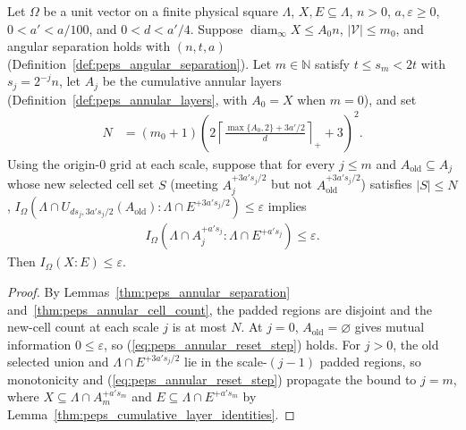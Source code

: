 \begin{lemma}
    \label{thm:peps_annular_information_induction}
    \leanok
    Let $\Omega$ be a unit vector on a finite physical square $\Lambda$,
    $X,E\subseteq\Lambda$, $n>0$, $a,\varepsilon\ge0$,
    $0<a'<a/100$, and $0<d<a'/4$. Suppose $\operatorname{diam}_\infty X\le A_0n$, $|\mathcal V|\le m_0$, and angular separation holds with $(n,t,a)$ (Definition~\ref{def:peps_angular_separation}).
    Let $m\in\mathbb N$ satisfy $t\le s_m<2t$ with $s_j=2^{-j}n$,
    let $A_j$ be the cumulative annular layers (Definition~\ref{def:peps_annular_layers}, with $A_0=X$ when $m=0$), and set
    \begin{align}
        N & =(m_0+1)\left(2\left\lceil
        \frac{\max\{A_0,2\}+3a'/2}{d}\right\rceil_++3\right)^2.
        \label{eq:peps_annular_induction_cell_budget}
    \end{align}
    Using the origin-$0$ grid at each scale, suppose that for every $j\le m$ and $A_{\mathrm{old}}\subseteq A_j$ whose new selected cell set $S$ (meeting $A_j^{+3a's_j/2}$ but not $A_{\mathrm{old}}^{+3a's_j/2}$) satisfies $|S|\le N$,
    $I_\Omega(\Lambda\cap U_{ds_j,3a's_j/2}(A_{\mathrm{old}}):\Lambda\cap E^{+3a's_j/2})\le\varepsilon$ implies
    \begin{align}
        I_\Omega(\Lambda\cap A_j^{+a's_j}:
        \Lambda\cap E^{+a's_j})\leq\varepsilon.
        \label{eq:peps_annular_reset_step}
    \end{align}
    Then $I_\Omega(X:E)\le\varepsilon$.
\end{lemma}
\begin{proof}\leanok
    By Lemmas~\ref{thm:peps_annular_separation} and~\ref{thm:peps_annular_cell_count}, the padded regions are disjoint and the new-cell count at each scale $j$ is at most $N$. At $j=0$, $A_{\mathrm{old}}=\varnothing$ gives mutual information $0\le\varepsilon$, so (\ref{eq:peps_annular_reset_step}) holds. For $j>0$, the old selected union and $\Lambda\cap E^{+3a's_j/2}$ lie in the scale-$(j-1)$ padded regions, so monotonicity and (\ref{eq:peps_annular_reset_step}) propagate the bound to $j=m$, where $X\subseteq\Lambda\cap A_m^{+a's_m}$ and $E\subseteq\Lambda\cap E^{+a's_m}$ by Lemma~\ref{thm:peps_cumulative_layer_identities}.
\end{proof}

